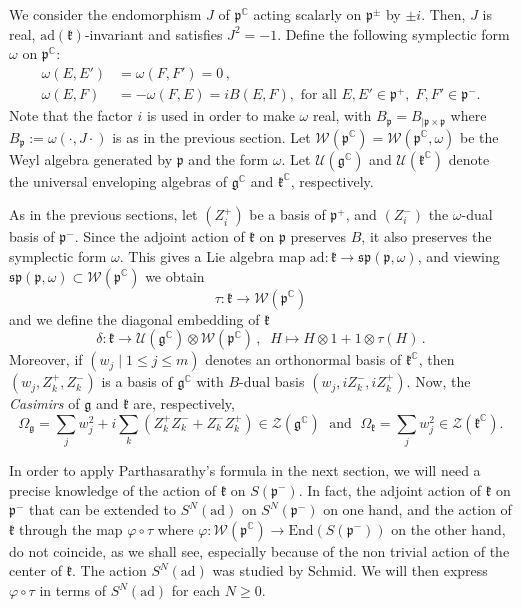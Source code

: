 \documentclass{amsart}[draft,11pt]
\newcommand{\fg}{{\mathfrak{g}}}
\newcommand{\fk}{{\mathfrak{k}}}
\newcommand{\fp}{{\mathfrak{p}}}
\newcommand{\CC}{{\mathbb{C}}}
\newcommand{\cW}{{\mathcal{W}}}
\newcommand{\ad}{{\mathrm{ad}}}
\numberwithin{equation}{section}
\theoremstyle{definition}
\begin{document}
We consider the endomorphism $J$ of
$\fp^\CC$ acting scalarly on $\fp^\pm$ by $\pm i$. Then, $J$ is real,
$\mathrm{ad}(\fk)$-invariant and satisfies $J^2=-1$. Define the following symplectic form $\omega$ on $\fp^\mathbb{C}$:
\begin{equation}
\begin{aligned}
\omega(E,E')&=\omega(F,F')=0 \,,\\
\omega(E,F)&=-\omega(F,E)=iB(E,F),\text{ for all }E,E'\in\fp^+,\;F,F'\in\fp^-.
\end{aligned}
\end{equation}
Note that the factor $i$ is used in order to make $\omega$ real, with
$B_\mathfrak{p}=B_{|\fp\times\fp}$ where 
$B_\fp:=\omega(\cdot,J\cdot)$ is as in the previous section. 
Let $\cW(\fp^\CC)=\cW(\fp^\CC,\omega)$ be the Weyl algebra generated by $\fp$ and the form $\omega$. Let $\mathcal{U}(\fg^\CC)$ and $\mathcal{U}(\fk^\CC)$ denote the universal enveloping algebras of $\fg^\CC$ and $\fk^\CC$, respectively. 

As in the previous sections, let $(Z_i^+)$ be a basis of $\fp^+$, and $(Z_i^-)$ the $\omega$-dual basis of $\fp^-$. Since the adjoint action of $\fk$ on $\fp$ preserves $B$, it also preserves the symplectic form $\omega$. This gives a Lie algebra map $\ad \colon \fk\to \mathfrak{sp}(\fp,\omega)$,
and viewing $\mathfrak{sp}(\fp,\omega) \subset \cW(\fp^\CC)$
we obtain
$$
\tau: \fk\to \cW(\fp^\CC)
$$
and we define the diagonal embedding of $\fk$
\begin{equation}
\delta \colon \fk \to 
\mathcal{U}(\fg^\CC)\otimes \cW(\fp^\CC)\,,
\;\;H\mapsto H\otimes 1+1\otimes \tau(H)\,.
\end{equation}
Moreover, if $(w_j\mid 1\le j\le m)$ denotes an orthonormal basis of $\fk^\CC$, then $(w_j,Z_k^+,Z_k^-)$ is a basis of $\fg^\CC$ with $B$-dual basis $(w_j,iZ_k^-,iZ_k^+)$. Now, the \emph{Casimirs} of $\fg$ and $\fk$ are, respectively,
\begin{equation}
\Omega_\fg=\sum_j w_j^2 +i\sum_k(Z_k^+Z_k^-+Z_k^- Z_k^+)\in \mathcal{Z}(\fg^\CC)\;\text{ and }\;
\Omega_\fk=\sum_j w_j^2\in \mathcal{Z}(\fk^\CC).
\end{equation}

In order to apply Parthasarathy's formula in the next section, we will
need a precise knowledge of the action of
$\fk$ on $S(\fp^-)$. In fact, the adjoint action
of $\fk$ on $\fp^-$ that can be extended to 
$S^N(\mathrm{ad})$ on $S^N(\fp^-)$ on one hand, and the action of $\fk$ through 
the map $\varphi \circ \tau$ where $\varphi \colon \cW(\fp^\mathbb{C})\to \mathrm{End}(S(\fp^-))$ on the other hand, do not coincide, as we shall see, especially because of the non trivial action of the center of $\fk$.
The action $S^N(\mathrm{ad})$ was studied
by Schmid. We will then express
$\varphi \circ \tau$ in terms of $S^N(\mathrm{ad})$ for each $N\geq 0$.
\end{document}
